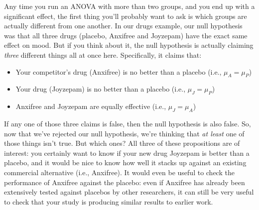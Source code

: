 

%
%


Any time you run an ANOVA with more than two groups, and you end up with a significant effect, the first thing you'll probably want to ask is which groups are actually different from one another. In our drugs example, our null hypothesis was that all three drugs (placebo, Anxifree and Joyzepam) have the exact same effect on mood. But if you think about it, the null hypothesis is actually claiming {\it three} different things all at once here. Specifically, it claims that:
\begin{itemize} \itemsep 0pt
\item Your competitor's drug (Anxifree) is no better than a placebo (i.e., $\mu_A = \mu_P$)
\item Your drug (Joyzepam) is no better than a placebo (i.e., $\mu_J = \mu_P$)
\item Anxifree and Joyzepam are equally effective (i.e., $\mu_J = \mu_A$)
\end{itemize}
If any one of those three claims is false, then the null hypothesis is also false. So, now that we've rejected our null hypothesis, we're thinking that {\it at least} one of those things isn't true. But which ones? All three of these propositions are of interest: you certainly want to know if your new drug Joyzepam is better than a placebo, and it would be nice to know how well it stacks up against an existing commercial alternative (i.e., Anxifree). It would even be useful to check the performance of Anxifree against the placebo: even if Anxifree has already been extensively tested against placebos by other researchers, it can still be very useful to check that your study is producing similar results to earlier work.

